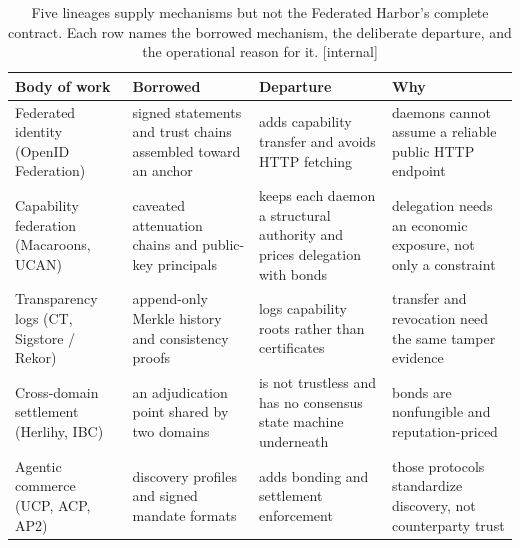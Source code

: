 %
\begin{table}[t]
\centering\footnotesize
\caption{Five lineages supply mechanisms but not the Federated Harbor's
complete contract. Each row names the borrowed mechanism, the deliberate
departure, and the operational reason for it. [internal]}
\label{tab:fh-related-borrow-depart}
\setlength{\tabcolsep}{3pt}
\renewcommand{\arraystretch}{1.12}
\begin{tabularx}{\textwidth}{@{}>{\raggedright\arraybackslash}p{} >{\raggedright\arraybackslash}X >{\raggedright\arraybackslash}X >{\raggedright\arraybackslash}X@{}}
\toprule
\textbf{Body of work} & \textbf{Borrowed} & \textbf{Departure} & \textbf{Why} \\
\midrule
Federated identity (OpenID Federation) & signed statements and trust chains assembled toward an anchor & adds capability transfer and avoids HTTP fetching & daemons cannot assume a reliable public HTTP endpoint \\
Capability federation (Macaroons, UCAN) & caveated attenuation chains and public-key principals & keeps each daemon a structural authority and prices delegation with bonds & delegation needs an economic exposure, not only a constraint \\
Transparency logs (CT, Sigstore / Rekor) & append-only Merkle history and consistency proofs & logs capability roots rather than certificates & transfer and revocation need the same tamper evidence \\
Cross-domain settlement (Herlihy, IBC) & an adjudication point shared by two domains & is not trustless and has no consensus state machine underneath & bonds are nonfungible and reputation-priced \\
Agentic commerce (UCP, ACP, AP2) & discovery profiles and signed mandate formats & adds bonding and settlement enforcement & those protocols standardize discovery, not counterparty trust \\
\bottomrule
\end{tabularx}
\end{table}
